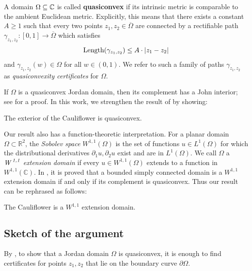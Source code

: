 A domain $\Omega\subseteq\mathbb{C}$ is called \textbf{quasiconvex} 
if its intrinsic metric is comparable to the ambient Euclidean metric. 
Explicitly, this means that there exists a constant $A\geq1$ such that every two points $z_{1},z_{2}\in \overline \Omega$
 are connected by a rectifiable path $\gamma_{z_1,z_2}: [0,1]\to \overline \Omega$ which satisfies
\begin{equation}
\operatorname{Length}(\gamma_{z_1,z_2})\leq A\cdot |z_{1}-z_{2} |	
\end{equation}
and  $\gamma_{z_1,z_2}(w) \in \Omega$ for all $w \in (0,1)$.
We refer to such a family of paths $\gamma_{z_1,z_2}$ as \emph{quasiconvexity certificates} for $\Omega$.

If $\Omega$ is a quasiconvex Jordan domain, then its complement has a John interior; see \cite[Corollary 3.4]{hakobyan_euclidean_2008} for a proof.
In this work, we strengthen the result of \cite[Theorem 6.1]{carleson_julia_1994} by showing:

\begin{theorem}
The exterior of the Cauliflower is quasiconvex.
\end{theorem}




Our result also has a function-theoretic interpretation. 
For a planar domain $\Omega \subset \mathbb R ^2$,
the \emph{Sobolev space} $W^{1,1}(\Omega)$ 
 is the set of functions $u \in L^1(\Omega)$ for which 
 the distributional derivatives $\partial_1 u, \partial_2 u$ exist and are in $L^1(\Omega)$.
We call $\Omega$ a 
\emph{$\textit{W}^\textit{\;1,1}$ extension domain}
 if every 
$u \in W^{1,1}(\Omega)$ extends to a function
in $W^{1,1}(\mathbb{C})$.
In \cite[Equation (1.1) and Theorem 1.4]{strong_bv_extension_2022}, 
it is proved that a bounded simply connected domain
is a $W^{1,1}$ extension domain if and only if its complement is quasiconvex.
Thus our result can be rephrased as follows:


 \begin{theorem}
 The Cauliflower is a $W^{1,1}$ extension domain.
 \end{theorem}
 
\subsection{Sketch of the argument}
By \cite[Corollary F]{hakobyan_euclidean_2008}, to show that a Jordan domain $\Omega$ is quasiconvex, it is enough to find certificates for points $z_{1},z_{2}$ that lie
on the boundary curve $\partial\Omega$.

